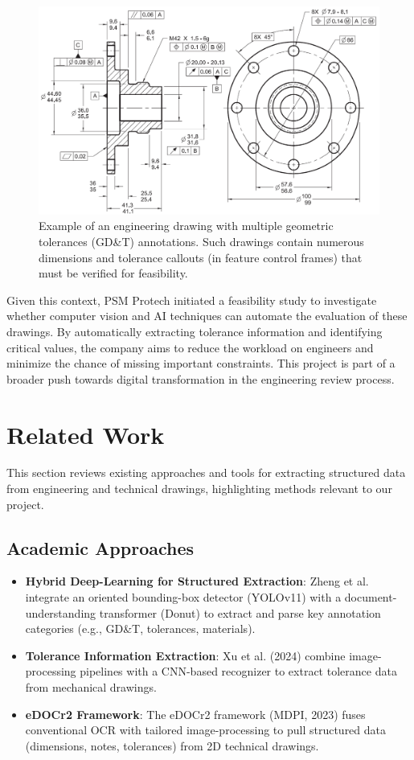 \documentclass[11pt,a4paper]{article}
\begin{document}
\begin{figure}[h!]
\centering
\includegraphics[width=\textwidth]{GDD-Drawing-Example.png}
\caption{Example of an engineering drawing with multiple geometric tolerances (GD\&T) annotations. Such drawings contain numerous dimensions and tolerance callouts (in feature control frames) that must be verified for feasibility.}
\label{fig:example_drawing}
\end{figure}

Given this context, PSM Protech initiated a feasibility study to investigate whether computer vision and AI techniques can automate the evaluation of these drawings. By automatically extracting tolerance information and identifying critical values, the company aims to reduce the workload on engineers and minimize the chance of missing important constraints. This project is part of a broader push towards digital transformation in the engineering review process.

\section*{Related Work}
This section reviews existing approaches and tools for extracting structured data from engineering and technical drawings, highlighting methods relevant to our project.

\subsection*{Academic Approaches}
\begin{itemize}
  \item \textbf{Hybrid Deep-Learning for Structured Extraction}: Zheng et al. integrate an oriented
    bounding-box detector (YOLOv11) with a document-understanding transformer (Donut) to
    extract and parse key annotation categories (e.g., GD\&T, tolerances, materials).
  \item \textbf{Tolerance Information Extraction}: Xu et al. (2024) combine image-processing pipelines
    with a CNN-based recognizer to extract tolerance data from mechanical drawings.
  \item \textbf{eDOCr2 Framework}: The eDOCr2 framework (MDPI, 2023) fuses conventional OCR with
    tailored image-processing to pull structured data (dimensions, notes, tolerances) from 2D
    technical drawings.
\end{itemize}
\end{document}
